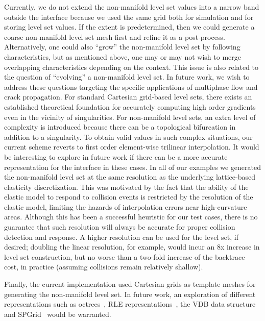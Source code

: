 Currently, we do not extend the non-manifold level set values into a
narrow band outside the interface because we used the same grid both
for simulation and for storing level set values. If the extent is
predetermined, then we could generate a coarse non-manifold level set
mesh first and refine it as a post-process. Alternatively, one could
also ``grow'' the non-manifold level set by following characteristics,
but as mentioned above, one may or may not wish to merge overlapping
characteristics depending on the context. This issue is also related
to the question of ``evolving'' a non-manifold level set.  In future
work, we wish to address these questions targeting the specific
applications of multiphase flow and crack propagation.  For standard
Cartesian grid-based level sets, there exists an established
theoretical foundation for accurately computing high order gradients
even in the vicinity of singularities. For non-manifold level sets, an
extra level of complexity is introduced because there can be a
topological bifurcation in addition to a singularity.  To obtain valid
values in such complex situations, our current scheme reverts to first
order element-wise trilinear interpolation.  It would be interesting
to explore in future work if there can be a more accurate
representation for the interface in these cases.  In all of our
examples we generated the non-manifold level set at the same
resolution as the underlying lattice-based elasticity
discretization. This was motivated by the fact that the ability of the
elastic model to respond to collision events is restricted by the
resolution of the elastic model, limiting the hazards of interpolation
errors near high-curvature areas.  Although this has been a successful
heuristic for our test cases, there is no guarantee that such
resolution will always be accurate for proper collision detection and
response. A higher resolution can be used for the level set, if
desired; doubling the linear resolution, for example, would incur an
8x increase in level set construction, but no worse than a two-fold
increase of the backtrace cost, in practice (assuming collisions
remain relatively shallow).

Finally, the current implementation used Cartesian grids as template
meshes for generating the non-manifold level set. In future work, an
exploration of different representations such as
octrees~\cite{LosasGF:2004}, RLE
representations~\cite{HoustNBNM:2006,IrvinGLF:2006,ChentM:2011}, the
VDB data structure~\cite{Muset:2013} and SPGrid~\cite{SetalABS:2014}
would be warranted.

